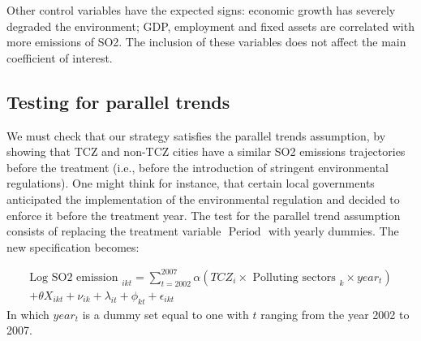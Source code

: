 \documentclass[12pt]{article}
\begin{document}
Other control variables have the expected signs: economic growth has severely degraded the environment; GDP, employment and fixed assets are correlated with more emissions of SO2. The inclusion of these variables does not affect the main coefficient of interest.

\subsection{Testing for parallel trends} \label{sec:parallel}

We must check that our strategy satisfies the parallel trends assumption, by showing that TCZ and non-TCZ cities have a similar SO2 emissions trajectories before the treatment (i.e., before the introduction of stringent environmental regulations). One might think for instance, that certain local governments anticipated the implementation of the environmental regulation and decided to enforce it before the treatment year. The test for the parallel trend assumption consists of replacing the treatment variable $\text { Period }$ with yearly dummies. The new specification becomes:

\begin{equation} \label{eq:paralleltrend}
\begin{aligned} 
\text {Log SO2 emission }_{i k t}=\sum_{t=2002}^{2007} \alpha (T C Z_{i}  \times \text {  Polluting sectors }_{k} \times year _{t})  \\ 
+ \theta {X}_{i k t}+\nu_{ik}+\lambda_{it} +\phi_{kt} +\epsilon_{ikt} 
\end{aligned}
\end{equation}
In which $year_t$ is a dummy set equal to one with $t$ ranging from the year 2002 to 2007. 
\end{document}
